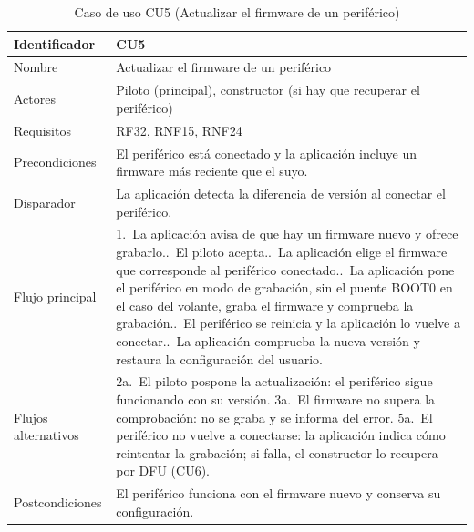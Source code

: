 \clearpage   %
\begin{table}[H]
	\centering
	\renewcommand{\arraystretch}{1.5}
	\begin{tabular}{|l|p{10cm}|}
		\hline
		Identificador & CU5 \\
		\hline
		Nombre & Actualizar el firmware de un periférico \\
		\hline
		Actores & Piloto (principal), constructor (si hay que recuperar el periférico) \\
		\hline
		Requisitos & RF32, RNF15, RNF24 \\
		\hline
		Precondiciones & El periférico está conectado y la aplicación incluye un firmware más reciente que el suyo. \\
		\hline
		Disparador & La aplicación detecta la diferencia de versión al conectar el periférico. \\
		\hline
		Flujo principal & 1.~La aplicación avisa de que hay un firmware nuevo y ofrece grabarlo.\newline
		2.~El piloto acepta.\newline
		3.~La aplicación elige el firmware que corresponde al periférico conectado.\newline
		4.~La aplicación pone el periférico en modo de grabación, sin el puente BOOT0 en el caso del volante, graba el firmware y comprueba la grabación.\newline
		5.~El periférico se reinicia y la aplicación lo vuelve a conectar.\newline
		6.~La aplicación comprueba la nueva versión y restaura la configuración del usuario. \\
		\hline
		Flujos alternativos & 2a.~El piloto pospone la actualización: el periférico sigue funcionando con su versión.\newline
		3a.~El firmware no supera la comprobación: no se graba y se informa del error.\newline
		5a.~El periférico no vuelve a conectarse: la aplicación indica cómo reintentar la grabación; si falla, el constructor lo recupera por DFU (CU6). \\
		\hline
		Postcondiciones & El periférico funciona con el firmware nuevo y conserva su configuración. \\
		\hline
	\end{tabular}
	\caption{Caso de uso CU5 (Actualizar el firmware de un periférico)}
	\label{tab:cu5}
\end{table}

